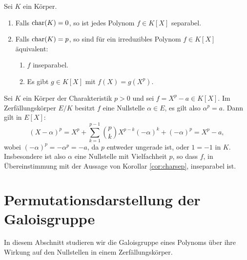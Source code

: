 \documentclass{book}
\begin{document}
\begin{cor} Sei $K$ ein Körper. 
    \label{cor:charsep}
    \begin{enumerate}
        \item Falls $\operatorname{char}(K) = 0$, so ist jedes Polynom $f \in K[X]$ separabel.
        \item Falls $\operatorname{char}(K) = p$, so sind für ein irreduzibles Polynom $f \in K[X]$ äquivalent:
            \begin{enumerate}[label=(\roman *)]
                \item $f$ inseparabel.
                \item Es gibt $g \in K[X]$ mit $f(X) = g(X^p)$. 
            \end{enumerate}
    \end{enumerate}
\end{cor}

\begin{exa}
    \label{exa:insep}
    Sei $K$ ein Körper der Charakteristik $p > 0$ und sei $f = X^p - a \in
    K[X]$. Im Zerfällungskörper $E/K$ besitzt $f$ eine Nullstelle $\alpha \in
    E$, es gilt also $\alpha^p = a$. Dann gilt in $E[X]$:
    \[
        (X-\alpha)^p = X^p + \sum_{k=1}^{p-1} {p \choose k} X^{p-k} (-\alpha)^{k} + (- \alpha)^p = X^p - a,
    \]
    wobei $(-\alpha)^p = - \alpha^p = -a$, da $p$ entweder ungerade ist, oder $1 = -1$ in $K$. 
    Insbesondere ist also $\alpha$ eine Nullstelle mit Vielfachheit $p$, so dass
    $f$, in Übereinstimmung mit der Aussage von Korollar \ref{cor:charsep},
    inseparabel ist. 
\end{exa}


\section{Permutationsdarstellung der Galoisgruppe}%
\label{sub:permutationsdarstellung_der_galoisgruppe}

In diesem Abschnitt studieren wir die Galoisgruppe eines Polynoms über ihre
Wirkung auf den Nullstellen in einem Zerfällungskörper. 
\end{document}
